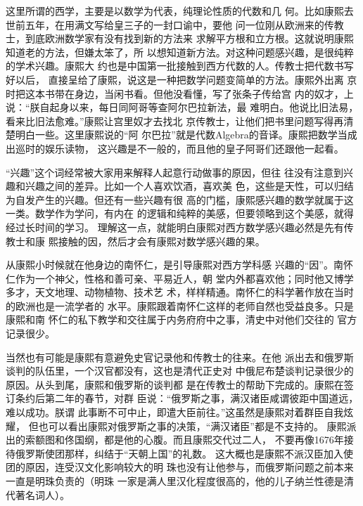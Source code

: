 这里所谓的西学，主要是以数学为代表，纯理论性质的代数和几%
何。比如康熙去世前五年，在用满文写给皇三子的一封口谕中，要他%
问一位刚从欧洲来的传教士，到底欧洲数学家有没有找到新的方法来%
求解平方根和立方根。这就说明康熙知道老的方法，但嫌太笨了，所%
以想知道新方法。对这种问题感兴趣，是很纯粹的学术兴趣。康熙大%
约也是中国第一批接触到西方代数的人。传教士把代数书写好以后，%
直接呈给了康熙，说这是一种把数学问题变简单的方法。康熙外出离%
京时把这本书带在身边，当闲书看。但他没看懂，写了张条子传给宫%
内的奴才，上说：“朕自起身以来，每日同阿哥等查阿尔巴拉新法，最%
难明白。他说比旧法易，看来比旧法愈难。”康熙让宫里奴才去找北%
京传教士，让他们把书里问题写得再清楚明白一些。这里康熙说的“阿%
尔巴拉”就是代数Algebra的音译。康熙把数学当成出巡时的娱乐读物，%
这兴趣是不一般的，而且他的皇子阿哥们还跟他一起看。%
\par
“兴趣”这个词经常被大家用来解释人起意行动做事的原因，但往%
往没有注意到兴趣和兴趣之间的差异。比如一个人喜欢饮酒，喜欢美%
色，这些是天性，可以归结为自发产生的兴趣。但还有一些兴趣有很%
高的门槛，康熙感兴趣的数学就属于这一类。数学作为学问，有内在%
的逻辑和纯粹的美感，但要领略到这个美感，就得经过长时间的学习。%
理解这一点，就能明白康熙对西方数学感兴趣必然是先有传教士和康%
熙接触的因，然后才会有康熙对数学感兴趣的果。%
\par
从康熙小时候就在他身边的南怀仁，是引导康熙对西方学科感%
兴趣的“因”。南怀仁作为一个神父，性格和善可亲、平易近人，朝%
堂内外都喜欢他；同时他又博学多才，天文地理、动物植物、技术艺%
术，样样精通。南怀仁的科学著作放在当时的欧洲也是一流学者的%
水平。康熙跟着南怀仁这样的老师自然也受益良多。只是康熙和南%
怀仁的私下教学和交往属于内务府府中之事，清史中对他们交往的%
官方记录很少。%
\par
当然也有可能是康熙有意避免史官记录他和传教士的往来。在他%
派出去和俄罗斯谈判的队伍里，一个汉官都没有，这也是清代正史对%
中俄尼布楚谈判记录很少的原因。从头到尾，康熙和俄罗斯的谈判都%
是在传教士的帮助下完成的。康熙在签订条约后第二年的春节，对群%
臣说：“俄罗斯之事，满汉诸臣咸谓彼距中国道远，难以成功。朕谓%
此事断不可中止，即遣大臣前往。”这虽然是康熙对着群臣自我炫耀，%
但也可以看出康熙对俄罗斯之事的决策，“满汉诸臣”都是不支持的。%
康熙派出的索额图和佟国纲，都是他的心腹。而且康熙交代过二人，%
不要再像1676年接待俄罗斯使团那样，纠结于“天朝上国”的礼数。%
这大概也是康熙不派汉臣加入使团的原因，连受汉文化影响较大的明%
珠也没有让他参与，而俄罗斯问题之前本来一直是明珠负责的（明珠%
一家是满人里汉化程度很高的，他的儿子纳兰性德是清代著名词人）。%
